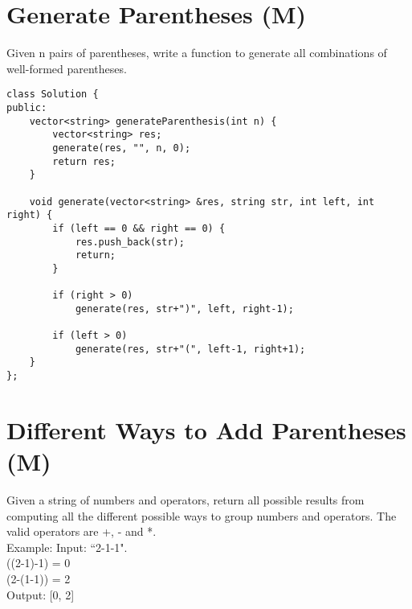\section{Generate Parentheses (M)}
Given n pairs of parentheses, write a function to generate all combinations of well-formed parentheses. \\
 
\begin{lstlisting}
class Solution {
public:
    vector<string> generateParenthesis(int n) {
        vector<string> res;
        generate(res, "", n, 0);
        return res;
    }
    
    void generate(vector<string> &res, string str, int left, int right) {
        if (left == 0 && right == 0) {
            res.push_back(str);
            return;
        }
            
        if (right > 0)
            generate(res, str+")", left, right-1);
            
        if (left > 0)
            generate(res, str+"(", left-1, right+1);
    }
};
\end{lstlisting}


\section{Different Ways to Add Parentheses (M)}
Given a string of numbers and operators, return all possible results from computing all the different possible ways to group numbers and operators. The valid operators are +, - and *.\\

Example: 
Input: ``2-1-1". \\
((2-1)-1) = 0\\
(2-(1-1)) = 2\\
Output: [0, 2]\\

